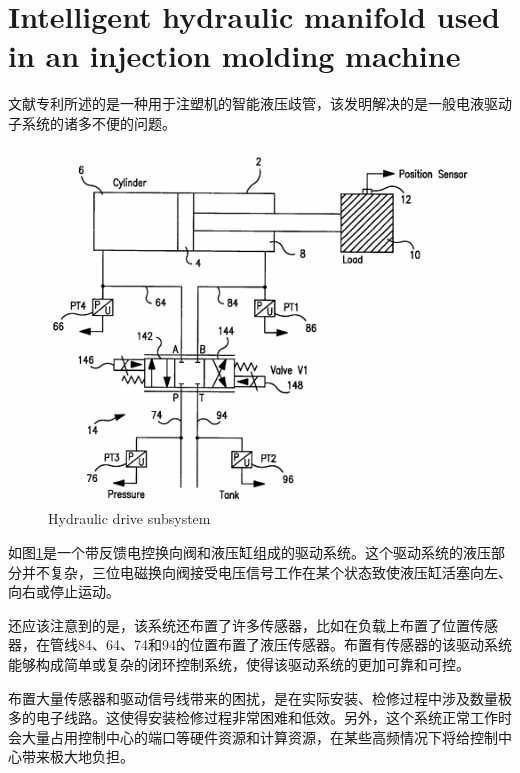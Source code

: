 \section{Intelligent hydraulic manifold used in an injection molding machine}

文献\parencite{US6289259B1}专利所述的是一种用于注塑机的智能液压歧管，该发明解决的是一般电液驱动子系统的诸多不便的问题。

\begin{figure}[!htp]
	\centering
	\includegraphics[width=\textwidth]{IMG/drivesubsys.png}
		{Hydraulic drive subsystem}
	\label{fig:drivesubsys}
\end{figure}

如图\ref{fig:drivesubsys}是一个带反馈电控换向阀和液压缸组成的驱动系统。这个驱动系统的液压部分并不复杂，三位电磁换向阀接受电压信号工作在某个状态致使液压缸活塞向左、向右或停止运动。

还应该注意到的是，该系统还布置了许多传感器，比如在负载上布置了位置传感器，在管线84、64、74和94的位置布置了液压传感器。布置有传感器的该驱动系统能够构成简单或复杂的闭环控制系统，使得该驱动系统的更加可靠和可控。

布置大量传感器和驱动信号线带来的困扰，是在实际安装、检修过程中涉及数量极多的电子线路。这使得安装检修过程非常困难和低效。另外，这个系统正常工作时会大量占用控制中心的端口等硬件资源和计算资源，在某些高频情况下将给控制中心带来极大地负担。

